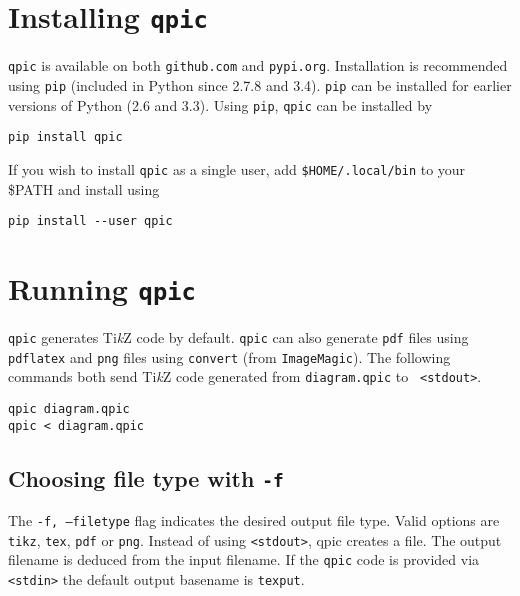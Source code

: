 \documentclass[twoside,12pt]{article}
\newcommand{\qpicpy}{{\tt qpic}\xspace}
\newcommand{\TikZ}{Ti\emph{k}Z\xspace}
\begin{document}
\section{Installing \qpicpy}\label{sec-install}
\qpicpy is available on both {\tt github.com} and {\tt pypi.org}. Installation is recommended using {\tt pip} (included
in Python since 2.7.8 and 3.4). {\tt pip} can be installed for earlier versions of Python (2.6 and 3.3).
Using {\tt pip}, \qpicpy can be installed by

\begin{minipage}{5in}
\begin{lstlisting}[basicstyle=\normalsize\ttfamily,numbers=none]
pip install qpic
\end{lstlisting}
\end{minipage}

If you wish to install \qpicpy as a single user, add {\tt \$HOME/.local/bin} to your {\$PATH} and install using

\begin{minipage}{5in}
\begin{lstlisting}[basicstyle=\normalsize\ttfamily,numbers=none]
pip install --user qpic
\end{lstlisting}
\end{minipage}

\section{Running \qpicpy}\label{sec-run}
\qpicpy generates \TikZ code by default. \qpicpy can also generate {\tt pdf} files
using {\tt pdflatex} and {\tt png} files using
{\tt convert} (from {\tt ImageMagic}). The following commands both send \TikZ code generated from {\tt diagram.qpic} to {\tt
<stdout>}.

\begin{minipage}{5in}
\begin{lstlisting}[basicstyle=\normalsize\ttfamily,numbers=none]
qpic diagram.qpic
qpic < diagram.qpic
\end{lstlisting}
\end{minipage}

\subsection{Choosing file type with {\tt -f}}
The {\tt -f, --filetype} flag indicates the desired output file type. Valid options are {\tt
tikz}, {\tt tex}, {\tt pdf} or {\tt png}. Instead of using {\tt <stdout>}, qpic creates a file. The output filename is deduced from
the input filename. If the {\tt qpic} code is provided via {\tt <stdin>} the
default output basename is {\tt texput}.
\end{document}
